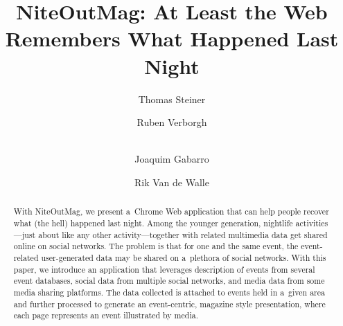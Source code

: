 \documentclass[runningheads,a4paper]{llncs}
\begin{document}
\title{NiteOutMag: At Least the Web\\ Remembers What Happened Last Night}

\author{Thomas Steiner \and
		Ruben Verborgh \and \\
		Joaquim Gabarro \and 
		Rik Van de Walle		
}


\maketitle
\setcounter{footnote}{0}

\begin{abstract}
With NiteOutMag, we present a~Chrome Web application that can help people recover what (the hell) happened last night. Among the younger generation, nightlife activities---just about like any other activity---together with related multimedia data get shared online on social networks. The problem is that for one and the same event, the event-related user-generated data may be shared on a~plethora of social networks. With this paper, we introduce an application that leverages description of events from several event databases, social data from multiple social networks, and media data from some media sharing platforms. The data collected is attached to events held in a~given area and further processed to generate an event-centric, magazine style presentation, where each page represents an event illustrated by media.
\end{abstract}
\end{document}
